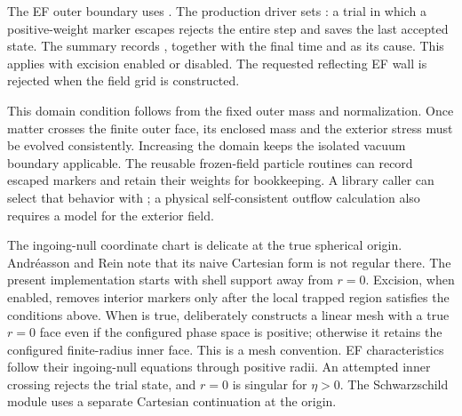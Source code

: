 The EF outer boundary uses . The production driver
sets : a trial in which a
positive-weight marker escapes rejects the entire step and saves the last
accepted state. The summary records
, together with the final time
and  as its cause. This applies with
excision enabled or disabled. The requested reflecting EF wall is rejected
when the field grid is constructed.

This domain condition follows from the fixed outer mass and normalization.
Once matter crosses the finite outer face, its enclosed mass and the exterior
stress must be evolved consistently. Increasing the domain keeps the isolated
vacuum boundary applicable. The reusable frozen-field particle routines can
record escaped markers and retain their weights for bookkeeping. A library
caller can select that behavior with
; a physical self-consistent
outflow calculation also requires a model for the exterior field.

The ingoing-null coordinate chart is delicate at the true spherical origin.
Andr\'easson and Rein note that its naive Cartesian form is not regular there.
The present implementation starts with shell support away from \(r=0\).
Excision, when enabled, removes interior markers only after the local trapped
region satisfies the conditions above.  When  is true,
 deliberately constructs a linear mesh with a true
\(r=0\) face even if the configured phase space  is positive;
otherwise it retains the configured finite-radius inner face.  This is a mesh
convention. EF characteristics follow their ingoing-null equations through
positive radii. An attempted inner crossing rejects the trial state, and
\(r=0\) is singular for \(\eta>0\). The Schwarzschild module uses a
separate Cartesian continuation at the origin.

